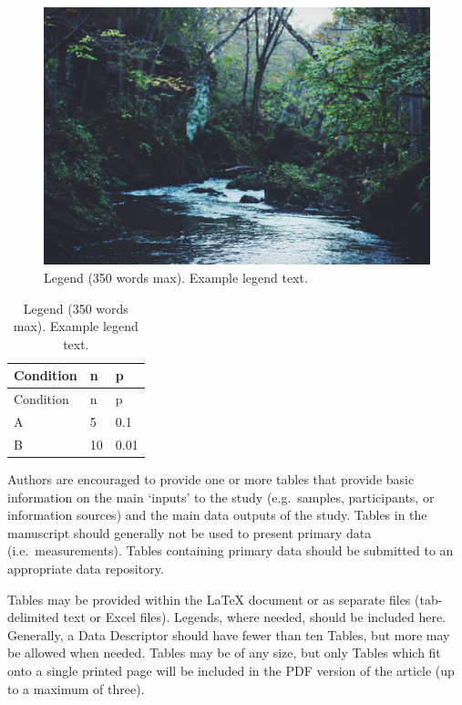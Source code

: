\documentclass[fleqn,10pt]{wlscirep}
\begin{document}
\begin{figure}

{\centering \includegraphics{stream.jpg}

}

\caption{\label{fig-stream}Legend (350 words max). Example legend text.}

\end{figure}

\hypertarget{tbl-example}{}
\begin{longtable}[]{@{}lll@{}}
\caption{\label{tbl-example}Legend (350 words max). Example legend
text.}\tabularnewline
\toprule\noalign{}
Condition & n & p \\
\midrule\noalign{}
\endfirsthead
\toprule\noalign{}
Condition & n & p \\
\midrule\noalign{}
\endhead
\bottomrule\noalign{}
\endlastfoot
A & 5 & 0.1 \\
B & 10 & 0.01 \\
\end{longtable}

Authors are encouraged to provide one or more tables that provide basic
information on the main `inputs' to the study (e.g.~samples,
participants, or information sources) and the main data outputs of the
study. Tables in the manuscript should generally not be used to present
primary data (i.e.~measurements). Tables containing primary data should
be submitted to an appropriate data repository.

Tables may be provided within the {\LaTeX} document or as separate files
(tab-delimited text or Excel files). Legends, where needed, should be
included here. Generally, a Data Descriptor should have fewer than ten
Tables, but more may be allowed when needed. Tables may be of any size,
but only Tables which fit onto a single printed page will be included in
the PDF version of the article (up to a maximum of three).
\end{document}
